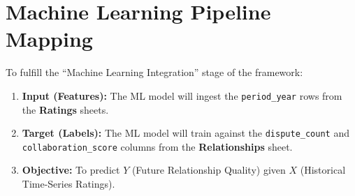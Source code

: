 \documentclass[11pt]{article}
\begin{document}
\section{Machine Learning Pipeline Mapping}
To fulfill the ``Machine Learning Integration'' stage of the framework:
\begin{enumerate}
    \item \textbf{Input (Features):} The ML model will ingest the \texttt{period\_year} rows from the \textbf{Ratings} sheets.
    \item \textbf{Target (Labels):} The ML model will train against the \texttt{dispute\_count} and \texttt{collaboration\_score} columns from the \textbf{Relationships} sheet.
    \item \textbf{Objective:} To predict $Y$ (Future Relationship Quality) given $X$ (Historical Time-Series Ratings).
\end{enumerate}
\end{document}
